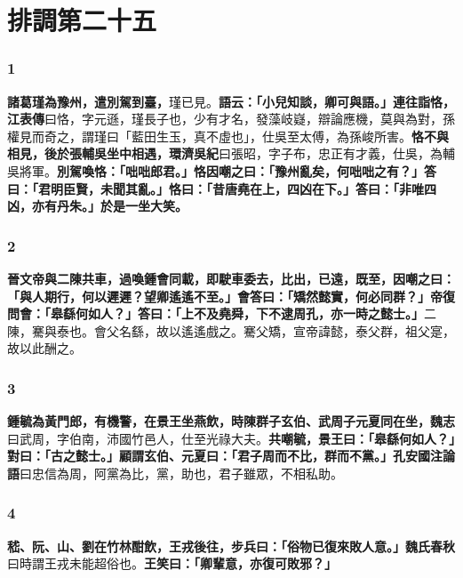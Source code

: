 \chapter{排調第二十五}

\subsection*{1}

\textbf{諸葛瑾為豫州，遣別駕到臺，}{\footnotesize 瑾已見。}\textbf{語云：「小兒知談，卿可與語。」連往詣恪，}{\footnotesize \textbf{江表傳}曰恪，字元遜，瑾長子也，少有才名，發藻岐嶷，辯論應機，莫與為對，孫權見而奇之，謂瑾曰「藍田生玉，真不虛也」，仕吳至太傅，為孫峻所害。}\textbf{恪不與相見，後於張輔吳坐中相遇，}{\footnotesize \textbf{環濟吳紀}曰張昭，字子布，忠正有才義，仕吳，為輔吳將軍。}\textbf{別駕喚恪：「咄咄郎君。」恪因嘲之曰：「豫州亂矣，何咄咄之有？」答曰：「君明臣賢，未聞其亂。」恪曰：「昔唐堯在上，四凶在下。」答曰：「非唯四凶，亦有丹朱。」於是一坐大笑。}

\subsection*{2}

\textbf{晉文帝與二陳共車，過喚鍾會同載，即駛車委去，比出，已遠，既至，因嘲之曰：「與人期行，何以遲遲？望卿遙遙不至。」會答曰：「矯然懿實，何必同群？」帝復問會：「皋繇何如人？」答曰：「上不及堯舜，下不逮周孔，亦一時之懿士。」}{\footnotesize 二陳，騫與泰也。會父名繇，故以遙遙戲之。騫父矯，宣帝諱懿，泰父群，祖父寔，故以此酬之。}

\subsection*{3}

\textbf{鍾毓為黃門郎，有機警，在景王坐燕飲，時陳群子玄伯、武周子元夏同在坐，}{\footnotesize \textbf{魏志}曰武周，字伯南，沛國竹邑人，仕至光祿大夫。}\textbf{共嘲毓，景王曰：「皋繇何如人？」對曰：「古之懿士。」顧謂玄伯、元夏曰：「君子周而不比，群而不黨。」}{\footnotesize \textbf{孔安國注論語}曰忠信為周，阿黨為比，黨，助也，君子雖眾，不相私助。}

\subsection*{4}

\textbf{嵇、阮、山、劉在竹林酣飲，王戎後往，步兵曰：「俗物已復來敗人意。」}{\footnotesize \textbf{魏氏春秋}曰時謂王戎未能超俗也。}\textbf{王笑曰：「卿輩意，亦復可敗邪？」}

